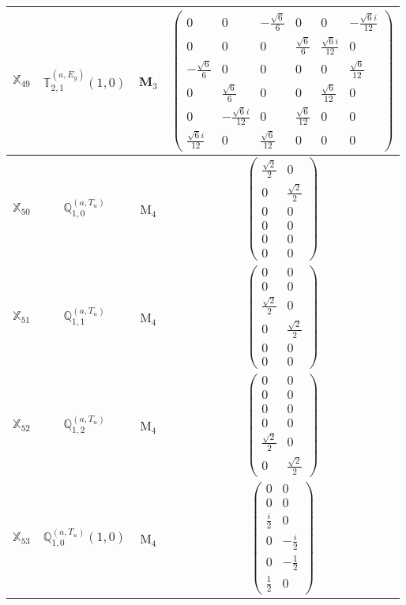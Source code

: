 \documentclass[fleqn,10pt,landscape]{article}
\begin{document}
\begin{itemize}
\begin{center}
\begin{longtable}{c|c|c|c}
$ \mathbb{X}_{49} $ & $\mathbb{T}_{2,1}^{(a,E_{g})}(1,0)$ & M$_{3}$ & $\begin{pmatrix} 0 & 0 & - \frac{\sqrt{6}}{6} & 0 & 0 & - \frac{\sqrt{6} i}{12} \\ 0 & 0 & 0 & \frac{\sqrt{6}}{6} & \frac{\sqrt{6} i}{12} & 0 \\ - \frac{\sqrt{6}}{6} & 0 & 0 & 0 & 0 & \frac{\sqrt{6}}{12} \\ 0 & \frac{\sqrt{6}}{6} & 0 & 0 & \frac{\sqrt{6}}{12} & 0 \\ 0 & - \frac{\sqrt{6} i}{12} & 0 & \frac{\sqrt{6}}{12} & 0 & 0 \\ \frac{\sqrt{6} i}{12} & 0 & \frac{\sqrt{6}}{12} & 0 & 0 & 0 \end{pmatrix}$ \\ \hline
$ \mathbb{X}_{50} $ & $\mathbb{Q}_{1,0}^{(a,T_{u})}$ & M$_{4}$ & $\begin{pmatrix} \frac{\sqrt{2}}{2} & 0 \\ 0 & \frac{\sqrt{2}}{2} \\ 0 & 0 \\ 0 & 0 \\ 0 & 0 \\ 0 & 0 \end{pmatrix}$ \\
$ \mathbb{X}_{51} $ & $\mathbb{Q}_{1,1}^{(a,T_{u})}$ & M$_{4}$ & $\begin{pmatrix} 0 & 0 \\ 0 & 0 \\ \frac{\sqrt{2}}{2} & 0 \\ 0 & \frac{\sqrt{2}}{2} \\ 0 & 0 \\ 0 & 0 \end{pmatrix}$ \\
$ \mathbb{X}_{52} $ & $\mathbb{Q}_{1,2}^{(a,T_{u})}$ & M$_{4}$ & $\begin{pmatrix} 0 & 0 \\ 0 & 0 \\ 0 & 0 \\ 0 & 0 \\ \frac{\sqrt{2}}{2} & 0 \\ 0 & \frac{\sqrt{2}}{2} \end{pmatrix}$ \\
$ \mathbb{X}_{53} $ & $\mathbb{Q}_{1,0}^{(a,T_{u})}(1,0)$ & M$_{4}$ & $\begin{pmatrix} 0 & 0 \\ 0 & 0 \\ \frac{i}{2} & 0 \\ 0 & - \frac{i}{2} \\ 0 & - \frac{1}{2} \\ \frac{1}{2} & 0 \end{pmatrix}$ \\

\end{longtable}
\end{center}
\end{itemize}
\end{document}
